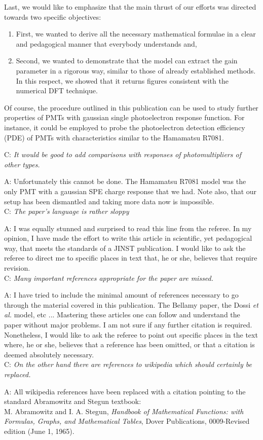 \documentclass[a4paper,11pt]{article}
\begin{document}
Last, we would like to emphasize that the main thrust of our efforts was directed towards two specific objectives:
\begin{enumerate}
\item First, we wanted to derive all the necessary mathematical formulae in a clear and pedagogical manner that everybody understands and,
\item Second, we wanted to demonstrate that the model can extract the gain parameter in a rigorous way, similar to those of already established methods. 
In this respect, we showed that it returns figures consistent with the numerical DFT technique.  
\end{enumerate}
Of course, the procedure outlined in this publication can be used to study further properties of PMTs with gaussian single photoelectron response function. 
For instance, it could be employed to probe the photoelectron detection efficiency (PDE) of PMTs with characteristics similar to the Hamamatsu R7081. 





C: \emph{It would be good to add comparisons with responses of photomultipliers of other types. }

A: Unfortunately this cannot be done. 
The Hamamatsu R7081 model was the only PMT with a gaussian SPE charge response that we had. 
Note also, that our setup has been dismantled and taking more data now is impossible.  
\\[1ex]

C: \emph{The paper's language is rather sloppy}

A: I was equally stunned and surprised to read this line from the referee. 
In my opinion, I have made the effort to write this article in scientific, yet pedagogical way, that meets the standards of a JINST publication. 
I would like to ask the referee to direct me to specific places in text that, he or she, believes that require revision. 
\\[1ex]

C: \emph{Many important references appropriate for the paper are missed.}

A: I have tried to include the minimal amount of references necessary to go through the material covered in this publication. 
The Bellamy paper, the Dossi \emph{et al.} model, etc ... Mastering these articles one can follow and understand the paper without major problems. 
I am not sure if any further citation is required. 
Nonetheless, I would like to ask the referee to point out specific places in the text where, he or she, believes that a reference has been omitted, or that a citation is deemed absolutely necessary.  
\\[1ex]

C: \emph{On the other hand there are references to wikipedia which should certainly be replaced. }

A: All wikipedia references have been replaced with a citation pointing to the standard Abramowitz and Stegun textbook:
\\[1ex]

M. Abramowitz and I. A. Stegun, \emph{Handbook of Mathematical Functions: with Formulas, Graphs, and Mathematical Tables}, Dover Publications, 0009-Revised edition (June 1, 1965).  
\end{document}
